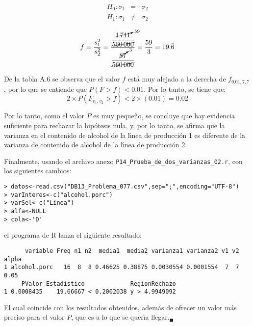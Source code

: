 \begin{solucion}
 \begin{hipotesis}
  \begin{eqnarray*}
   H_0: \sigma_1 &  =   & \sigma_2 \\
   H_1: \sigma_1 & \neq & \sigma_2
  \end{eqnarray*}
 \end{hipotesis}

 \begin{estadistico}
  \begin{equation*}
   f = \frac{s_1^2}{s_2^2}
   = \frac{\displaystyle{\frac{\cancelto{59}{1\,711}}{\cancel{560\,000}}}}
   {\displaystyle{\frac{\cancelto{3}{87}}{\cancel{560\,000}}}}
   = \frac{59}{3} = 19.\bar{6}
  \end{equation*}
 \end{estadistico}

 \begin{valorp}
  De la tabla A.6 se observa que el valor $f$
  est\'a muy alejado a la derecha de $f_{0.01,7,7}$, 
  por lo que se entiende que $P(F > f) < 0.01$.
  Por lo tanto, se tiene que:
  \begin{equation*}
   2\times P\left( F_{v_1,v_2} > f \right) < 2\times(0.01) = 0.02
  \end{equation*}
 \end{valorp}

 \begin{conclusion}
  Por lo tanto, como el valor $P$ es muy peque\~no,
  se concluye que hay evidencia suficiente para rechazar la hip\'otesis nula,
  y, por lo tanto, se afirma que la varianza en el contenido de alcohol
  de la l\'{\i}nea de producci\'on 1 es diferente
  de la varianza de contenido de alcohol de la l\'{\i}nea de producci\'on 2.
 \end{conclusion}

 Finalmente, usando el archivo anexo \texttt{P14\_Prueba\_de\_dos\_varianzas\_02.r}, con los siguientes cambios:
 \begin{verbatim}
> datos<-read.csv("DB13_Problema_077.csv",sep=";",encoding="UTF-8")
> varInteres<-c("alcohol.porc")
> varSel<-c("Línea")
> alfa<-NULL
> cola<-'D'
 \end{verbatim}
 \vspace{-0.5cm}
 el programa de R lanza el siguiente resultado:
 \begin{verbatim}
      variable Freq n1 n2  media1  media2 varianza1 varianza2 v1 v2 alpha
1 alcohol.porc   16  8  8 0.46625 0.38875 0.0030554 0.0001554  7  7  0.05
     PValor Estadistico             RegionRechazo
1 0.0008435    19.66667 < 0.2002038 y > 4.9949092
 \end{verbatim}
 \vspace{-0.5cm}
 El cual coincide con los resultados obtenidos,
 adem\'as de ofrecer un valor m\'as preciso para el valor $P$,
 que es a lo que se quer\'{\i}a llegar.${}_{\blacksquare}$
\end{solucion}
